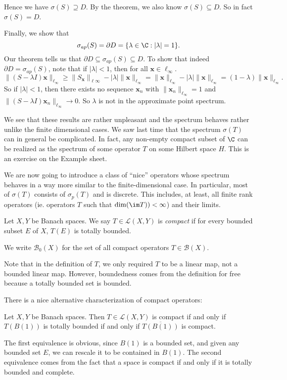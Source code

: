 \documentclass[a4paper]{article}
\begin{document}
\begin{eg}
  Hence we have $\sigma(S) \supseteq D$. By the theorem, we also know $\sigma(S) \subseteq D$. So in fact $\sigma(S) = D$.

  Finally, we show that
  \[
    \sigma_{ap}(S) = \partial D = \{\lambda \in \C: |\lambda| = 1\}.
  \]
  Our theorem tells us that $\partial D \subseteq \sigma_{ap}(S) \subseteq D$. To show that indeed $\partial D = \sigma_{ap}(S)$, note that if $|\lambda| < 1$, then for all $\mathbf{x} \in \ell_\infty$.
  \[
    \|(S - \lambda I)\mathbf{x}\|_{\ell_\infty} \geq \|S_\mathbf{x}\|_{\ell\infty} - |\lambda|\|\mathbf{x}\|_{\ell_\infty} = \|\mathbf{x}\|_{\ell_\infty} - |\lambda| \|\mathbf{x}\|_{\ell_\infty} = (1 - \lambda) \|\mathbf{x}\|_{\ell_\infty}.
  \]
  So if $|\lambda| < 1$, then there exists no sequence $\mathbf{x}_n$ with $\|\mathbf{x}_n\|_{\ell_\infty} = 1$ and $\|(S - \lambda I) \mathbf{x}_n \|_{\ell_\infty} \to 0$. So $\lambda$ is not in the approximate point spectrum.
\end{eg}
We see that these results are rather unpleasant and the spectrum behaves rather unlike the finite dimensional cases. We saw last time that the spectrum $\sigma(T)$ can in general be complicated. In fact, any non-empty compact subset of $\C$ can be realized as the spectrum of some operator $T$ on some Hilbert space $H$. This is an exercise on the Example sheet.

We are now going to introduce a class of ``nice'' operators whose spectrum behaves in a way more similar to the finite-dimensional case. In particular, most of $\sigma(T)$ consists of $\sigma_p(T)$ and is discrete. This includes, at least, all finite rank operators (ie. operators $T$ such that $\dim (\im T)) < \infty$) and their limits.

\begin{defi}
  Let $X, Y$ be Banach spaces. We say $T \in \mathcal{L}(X, Y)$ is \emph{compact} if for every bounded subset $E$ of $X$, $T(E)$ is totally bounded.

  We write $\mathcal{B}_0(X)$ for the set of all compact operators $T \in \mathcal{B}(X)$.
\end{defi}
Note that in the definition of $T$, we only required $T$ to be a linear map, not a bounded linear map. However, boundedness comes from the definition for free because a totally bounded set is bounded.

There is a nice alternative characterization of compact operators:
\begin{prop}
  Let $X, Y$ be Banach spaces. Then $T \in \mathcal{L}(X, Y)$ is compact if and only if $T(B(1))$ is totally bounded if and only if $\overline{T(B(1))}$ is compact.
\end{prop}
The first equivalence is obvious, since $B(1)$ is a bounded set, and given any bounded set $E$, we can rescale it to be contained in $B(1)$. The second equivalence comes from the fact that a space is compact if and only if it is totally bounded and complete.
\end{document}
